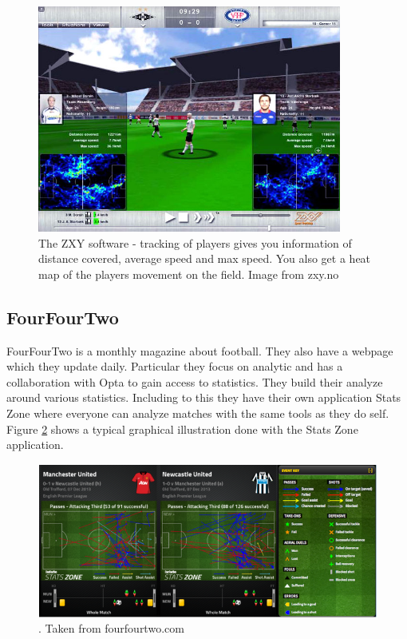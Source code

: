 \begin{figure}[ht!]
\centering
\includegraphics[width=100mm]{images/general/zxysoftware.png}
\caption{The ZXY software - tracking of players gives you information of distance covered, average speed and max speed. You also get a heat map of the players movement on the field. Image from zxy.no}
\label{fig:zxysoftware}
\end{figure}


\subsection{FourFourTwo}

FourFourTwo is a monthly magazine about football. They also have a webpage which they update daily. Particular they focus on analytic and has a collaboration with Opta to gain access to statistics. They build their analyze around various statistics. Including to this they have their own application Stats Zone where everyone can analyze matches with the same tools as they do self. Figure \ref{fig:fourfourtwo} shows a typical
graphical illustration done with the Stats Zone application. 

\begin{figure}[ht!]
\centering
\includegraphics[width=1\textwidth]{images/general/fourfourtwo.png}
\caption{. Taken from fourfourtwo.com}
\label{fig:fourfourtwo}
\end{figure}